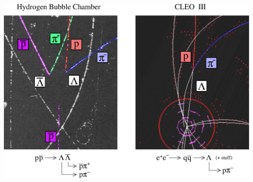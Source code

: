 \begin{slide*}
\slideframe{}
\begin{minipage}[t]{\linewidth}

\vspace{0.1 cm}

\begin{center}
  \includegraphics[width=0.85\linewidth]{2lambdas_sidebyside_small.eps}


\end{center}
\end{minipage}
\end{slide*}
